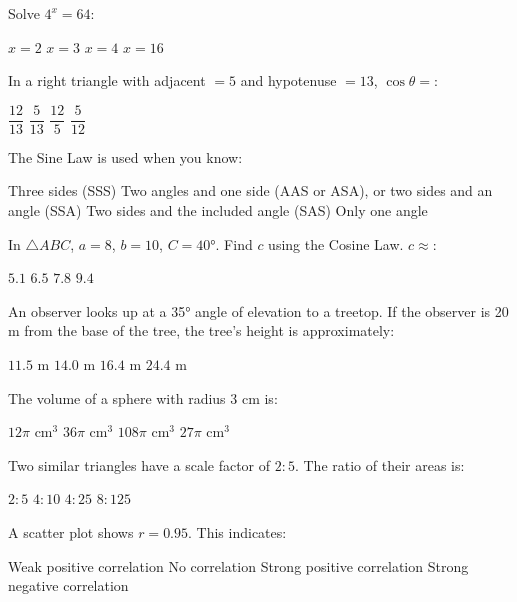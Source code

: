 \documentclass[addpoints]{exam}
\begin{document}
\begin{questions}
\question[1] Solve $4^x = 64$:
\begin{choices}
    \choice $x = 2$
    \correctchoice $x = 3$
    \choice $x = 4$
    \choice $x = 16$
\end{choices}

\question[1] In a right triangle with adjacent $= 5$ and hypotenuse $= 13$, $\cos\theta =$:
\begin{choices}
    \choice $\dfrac{12}{13}$
    \correctchoice $\dfrac{5}{13}$
    \choice $\dfrac{12}{5}$
    \choice $\dfrac{5}{12}$
\end{choices}

\question[1] The Sine Law is used when you know:
\begin{choices}
    \choice Three sides (SSS)
    \correctchoice Two angles and one side (AAS or ASA), or two sides and an angle (SSA)
    \choice Two sides and the included angle (SAS)
    \choice Only one angle
\end{choices}

\question[1] In $\triangle ABC$, $a = 8$, $b = 10$, $C = \ang{40}$. Find $c$ using the Cosine Law.
$c \approx$:
\begin{choices}
    \choice $5.1$
    \correctchoice $6.5$
    \choice $7.8$
    \choice $9.4$
\end{choices}

\question[1] An observer looks up at a \ang{35} angle of elevation to a treetop. If the observer
is 20 m from the base of the tree, the tree's height is approximately:
\begin{choices}
    \choice $11.5$ m
    \correctchoice $14.0$ m
    \choice $16.4$ m
    \choice $24.4$ m
\end{choices}

\question[1] The volume of a sphere with radius 3 cm is:
\begin{choices}
    \choice $12\pi$ cm$^3$
    \correctchoice $36\pi$ cm$^3$
    \choice $108\pi$ cm$^3$
    \choice $27\pi$ cm$^3$
\end{choices}

\question[1] Two similar triangles have a scale factor of $2:5$. The ratio of their areas is:
\begin{choices}
    \choice $2:5$
    \choice $4:10$
    \correctchoice $4:25$
    \choice $8:125$
\end{choices}

\question[1] A scatter plot shows $r = 0.95$. This indicates:
\begin{choices}
    \choice Weak positive correlation
    \choice No correlation
    \correctchoice Strong positive correlation
    \choice Strong negative correlation
\end{choices}


\end{questions}
\end{document}
